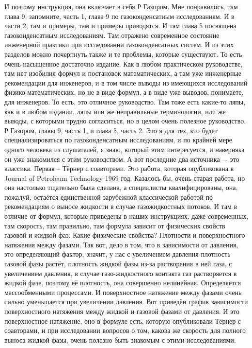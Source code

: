 \documentclass[main.tex]{subfiles}
\begin{document}
И поэтому инструкция, она включает в себя Р Газпром.
Мне понравилось, там глава 9, запомните, часть 1, глава 9 по газоконденсатным исследованиям.
И в части 2, там и примеры, там и примеры приводятся.
И там глава 5 посвящена газоконденсатным исследованиям.
Там отражено современное состояние инженерной практики при исследовании газоконденсатных систем.
И из этих разделов можно почерпнуть также и те проблемы, которые существуют.
То есть очень насыщенное достаточно издание.
Как в любом практическом руководстве, там нет изобилия формул и постановок математических, а там уже инженерные рекомендации для инженеров, и в том числе выводы из имеющихся исследований физико-математических, но не в виде формул, а в виде уже выводов, понимаете, для инженеров.
То есть, это отличное руководство.
Там тоже есть какие-то ляпы, как и в любом издании, ляпы или же неправильные терминологии, или же выводы, с которыми трудно согласиться, но в целом очень полезное руководство.
Р Газпром, главы 9, часть 1, и глава 5, часть 2.
Это я для тех, кто будет специализироваться по газоконденсатным исследованиям, и по крайней мере одного человека из слушателей, я знаю, который этим интересуется, и наверняка он уже знакомился с этим руководством.
А вот последние два источника –- это классика.
Первая -- Тёрнер с соавторами.
Это работа, которая опубликована в Journal of Petroleum Technology 1969 год.
Казалось бы, очень старая работа, но она настолько тщательно была сделана, а специалисты квалифицированы, она, пожалуй, остаётся единственной зарубежной классической работой по рекомендациям о выносе жидкости в случае газожидкостных потоков.
И там в отличие от формул, которые приведены в наших инструкциях, даже современных, там скорость, там правильно, там формула зависит от физических свойств газовой и жидкой фаз.
Какие физические свойства?
Плотности и поверхностного натяжения между фазами.
Так вот, дело в том, что в зависимости от давления, это определяющий фактор, значит, у нас с увеличением давления плотность газовой фазы растёт, плотность жидкой фазы из-за растворения в ней газа, с увеличением давления, в случае газо-жидкостного контакта газ растворяется в жидкой фазе, поэтому её плотность, она совершенно нелинейная.
Определяется массообменными процессами.
И поверхностное натяжение между фазами очень сильно уменьшается при увеличении давления.
Вот приведён график зависимости поверхностного натяжения между жидкой и газовой фазами от давления.
И это поверхностное натяжение, оно в формуле есть, которую опубликовали Тёрнер с соавторами, и при исследовании вопросов о том, какова же скорость для полного выноса жидкой фазы, очень полезно быть знакомым с этими исследованиями.
\end{document}
